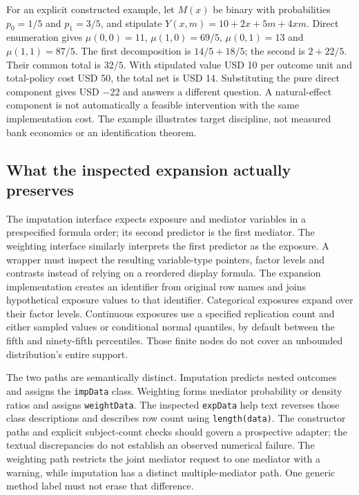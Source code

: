 For an explicit constructed example, let $M(x)$ be binary with probabilities
$p_0=1/5$ and $p_1=3/5$, and stipulate
$Y(x,m)=10+2x+5m+4xm$. Direct enumeration gives
$\mu(0,0)=11$, $\mu(1,0)=69/5$, $\mu(0,1)=13$ and
$\mu(1,1)=87/5$. The first decomposition is $14/5+18/5$;
the second is $2+22/5$. Their common total is $32/5$. With
stipulated value USD 10 per outcome unit and total-policy cost USD 50,
the total net is USD 14. Substituting the pure direct component gives
USD $-22$ and answers a different question. A natural-effect component
is not automatically a feasible intervention with the same implementation
cost. The example illustrates target discipline, not measured bank economics
or an identification theorem.
\citep{exec23_medflex_reference}

\subsection{What the inspected expansion actually preserves}
\label{exec23:medflex-expansion}
The imputation interface expects exposure and mediator variables in a
prespecified formula order; its second predictor is the first mediator.
The weighting interface similarly interprets the first predictor as the
exposure. A wrapper must inspect the resulting variable-type pointers, factor
levels and contrasts instead of relying on a reordered display formula.
The expansion implementation creates an identifier from original row names
and joins hypothetical exposure values to that identifier. Categorical
exposures expand over their factor levels. Continuous exposures use a
specified replication count and either sampled values or conditional normal
quantiles, by default between the fifth and ninety-fifth percentiles. Those
finite nodes do not cover an unbounded distribution's entire support.
\citep{exec23_medflex_sources}

The two paths are semantically distinct. Imputation predicts nested outcomes
and assigns the \texttt{impData} class. Weighting forms mediator probability
or density ratios and assigns \texttt{weightData}. The inspected
\texttt{expData} help text reverses those class descriptions and describes
row count using \texttt{length(data)}. The constructor paths and explicit
subject-count checks should govern a prospective adapter; the textual
discrepancies do not establish an observed numerical failure. The weighting
path restricts the joint mediator request to one mediator with a warning,
while imputation has a distinct multiple-mediator path. One generic method
label must not erase that difference.
\citep{exec23_medflex_sources}

